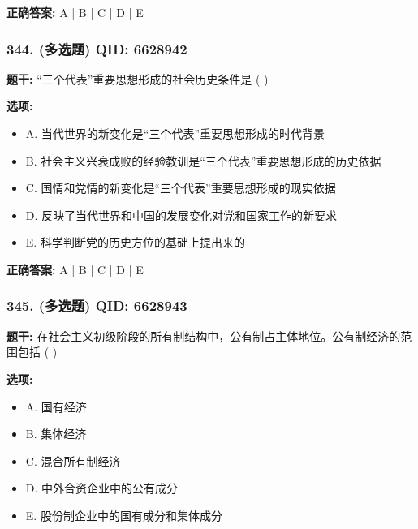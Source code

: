 \documentclass[12pt,UTF8]{ctexart}
\begin{document}
\textbf{正确答案:}
A | B | C | D | E

\vspace{0.3em}\hrulefill\vspace{0.7em}

\subsubsection*{344. (多选题) \small QID: 6628942}

\textbf{题干:}
“三个代表”重要思想形成的社会历史条件是  ( )

\textbf{选项:}
\begin{itemize}[leftmargin=*]

  \item A. 当代世界的新变化是“三个代表”重要思想形成的时代背景

  \item B. 社会主义兴衰成败的经验教训是“三个代表”重要思想形成的历史依据

  \item C. 国情和党情的新变化是“三个代表”重要思想形成的现实依据

  \item D. 反映了当代世界和中国的发展变化对党和国家工作的新要求

  \item E. 科学判断党的历史方位的基础上提出来的

\end{itemize}

\textbf{正确答案:}
A | B | C | D | E

\vspace{0.3em}\hrulefill\vspace{0.7em}

\subsubsection*{345. (多选题) \small QID: 6628943}

\textbf{题干:}
在社会主义初级阶段的所有制结构中，公有制占主体地位。公有制经济的范围包括  ( )

\textbf{选项:}
\begin{itemize}[leftmargin=*]

  \item A. 国有经济

  \item B. 集体经济

  \item C. 混合所有制经济

  \item D. 中外合资企业中的公有成分

  \item E. 股份制企业中的国有成分和集体成分

\end{itemize}
\end{document}
